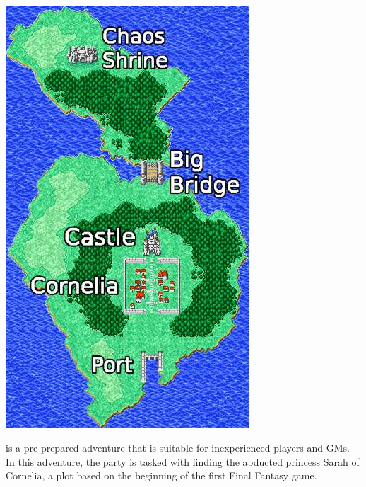 %
\\
%
\begin{center} \includegraphics[width=\columnwidth]{./art/chaosincornelia/map.jpg} \end{center}
%
 is a pre-prepared adventure that is suitable for inexperienced players and GMs.
In this adventure, the party is tasked with finding the abducted princess Sarah of Cornelia, a plot based on the beginning of the first Final Fantasy game.
